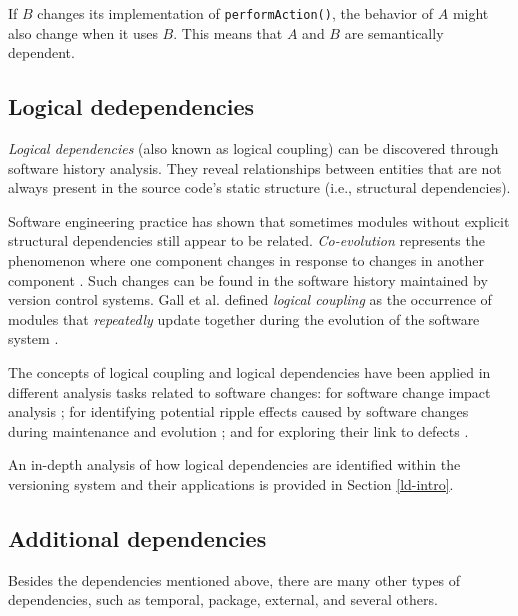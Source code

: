 If \(B\) changes its implementation of \texttt{performAction()}, the behavior of \(A\) might also change when it uses \(B\). This means that \(A\) and \(B\) are semantically dependent.



\subsection{Logical dedependencies}
\hspace{4em} \textit{Logical dependencies} (also known as logical coupling) can be discovered through software history analysis. They reveal relationships between entities that are not always present in the source code's static structure (i.e., structural dependencies).

Software engineering practice has shown that sometimes modules without explicit structural dependencies still appear to be related. \textit{Co-evolution} represents the phenomenon where one component changes in response to changes in another component \cite{Yu:2007:UCC:1231330.1231370, Cataldo2009SoftwareDW}. Such changes can be found in the software history maintained by version control systems. Gall et al. defined \textit{logical coupling} as the occurrence of modules that \emph{repeatedly} update together during the evolution of the software system \cite{Gall:1998:DLC:850947.853338, Gall:2003:CRH:942803.943741, 6606615}.

The concepts of logical coupling and logical dependencies have been applied in different analysis tasks related to software changes: for software change impact analysis \cite{1553643}; for identifying potential ripple effects caused by software changes during maintenance and evolution \cite{DBLP:conf/issre/OlivaG15, Oliva:2011:ISL:2067853.2068086, Poshyvanyk2009, posh2010}; and for exploring their link to defects \cite{wiese, Zimmermann:2004:MVH:998675.999460}.

An in-depth analysis of how logical dependencies are identified within the versioning system and their applications is provided in Section \ref{ld-intro}.



\subsection{Additional dependencies}

\hspace{4em} Besides the dependencies mentioned above, there are many other types of dependencies, such as temporal, package, external, and several others.

